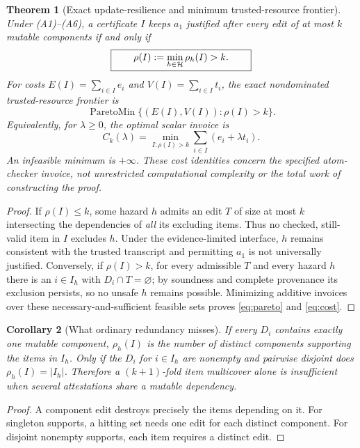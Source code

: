 \documentclass[11pt]{article}
\newtheorem{theorem}{Theorem}
\newtheorem{corollary}[theorem]{Corollary}
\begin{document}
\begin{theorem}[Exact update-resilience and minimum trusted-resource frontier]\label{th:main}
Under (A1)--(A6), a certificate $I$ keeps $a_1$ justified after \emph{every} edit of at most $k$ mutable components if and only if
\begin{equation}
\boxed{\qquad \rho(I):=\min_{h\in\mathcal H}\rho_h(I)>k.\qquad}\label{eq:main}
\end{equation}
For costs $E(I)=\sum_{i\in I}e_i$ and $V(I)=\sum_{i\in I}t_i$, the exact nondominated trusted-resource frontier is
\begin{equation}
\operatorname{ParetoMin}\{(E(I),V(I)):\rho(I)>k\}.
\label{eq:pareto}
\end{equation}
Equivalently, for $\lambda\ge0$, the optimal scalar invoice is
\begin{equation}
\boxed{\qquad C_k(\lambda)=\min_{I:\rho(I)>k}\sum_{i\in I}(e_i+\lambda t_i).\qquad}\label{eq:cost}
\end{equation}
An infeasible minimum is $+\infty$. These cost identities concern the specified atom-checker invoice, not unrestricted computational complexity or the total work of constructing the proof.
\end{theorem}
\begin{proof}
If $\rho(I)\le k$, some hazard $h$ admits an edit $T$ of size at most $k$ intersecting the dependencies of \emph{all} its excluding items. Thus no checked, still-valid item in $I$ excludes $h$. Under the evidence-limited interface, $h$ remains consistent with the trusted transcript and permitting $a_1$ is not universally justified. Conversely, if $\rho(I)>k$, for every admissible $T$ and every hazard $h$ there is an $i\in I_h$ with $D_i\cap T=\varnothing$; by soundness and complete provenance its exclusion persists, so no unsafe $h$ remains possible. Minimizing additive invoices over these necessary-and-sufficient feasible sets proves \eqref{eq:pareto} and \eqref{eq:cost}.
\end{proof}

\begin{corollary}[What ordinary redundancy misses]\label{co:redundancy}
If every $D_i$ contains exactly one mutable component, $\rho_h(I)$ is the number of \emph{distinct} components supporting the items in $I_h$. Only if the $D_i$ for $i\in I_h$ are nonempty and pairwise disjoint does $\rho_h(I)=|I_h|$. Therefore a $(k+1)$-fold item multicover alone is insufficient when several attestations share a mutable dependency.
\end{corollary}
\begin{proof}A component edit destroys precisely the items depending on it. For singleton supports, a hitting set needs one edit for each distinct component. For disjoint nonempty supports, each item requires a distinct edit.\end{proof}
\end{document}
